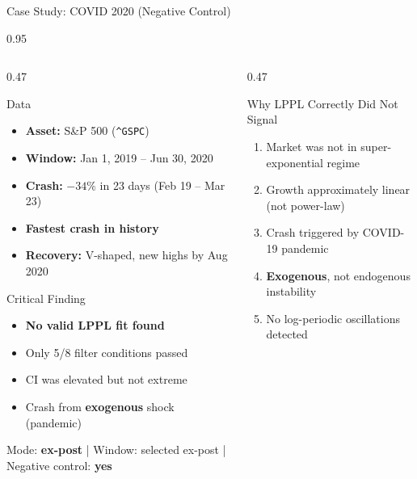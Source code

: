\documentclass[9pt, aspectratio=169, t]{beamer}
\begin{document}
\begin{frame}{Case Study: COVID 2020 (Negative Control)}
    \begin{cminipage}{0.95\textwidth}
    {\footnotesize
    \begin{columns}[T]
        \begin{column}{0.47\textwidth}
            \begin{block}{Data}
                \begin{itemize}\setlength{\itemsep}{0pt}
                    \item \textbf{Asset:} S\&P 500 (\texttt{\^{}GSPC})
                    \item \textbf{Window:} Jan 1, 2019 -- Jun 30, 2020
                    \item \textbf{Crash:} $-34\%$ in 23 days (Feb 19 -- Mar 23)
                    \item \textbf{Fastest crash in history}
                    \item \textbf{Recovery:} V-shaped, new highs by Aug 2020
                \end{itemize}
            \end{block}

            \begin{alertblock}{Critical Finding}
                \begin{itemize}\setlength{\itemsep}{0pt}
                    \item \textbf{No valid LPPL fit found}
                    \item Only 5/8 filter conditions passed
                    \item CI was elevated but not extreme
                    \item Crash from \textbf{exogenous} shock (pandemic)
                \end{itemize}
            \end{alertblock}
            \vspace{-2mm}
            {\scriptsize\textcolor{MediumGray}{Mode: \textbf{ex-post} | Window: selected ex-post | Negative control: \textbf{yes}}}
        \end{column}
        \begin{column}{0.47\textwidth}
            \begin{exampleblock}{Why LPPL Correctly Did Not Signal}
                \begin{enumerate}\setlength{\itemsep}{0pt}
                    \item Market was not in super-exponential regime
                    \item Growth approximately linear (not power-law)
                    \item Crash triggered by COVID-19 pandemic
                    \item \textbf{Exogenous}, not endogenous instability
                    \item No log-periodic oscillations detected
                \end{enumerate}
            \end{exampleblock}


\end{column}
\end{columns}}
\end{cminipage}
\end{frame}
\end{document}
